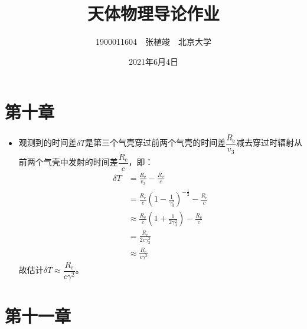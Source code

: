 \documentclass[a4paper,fontset=none]{ctexart}
\begin{document}
\title{\textbf{天体物理导论作业}}
\author{1900011604\ \ 张植竣\ \ 北京大学}
\date{2021年6月4日}
\maketitle

\section*{第十章}

\begin{itemize}

\item[1.]
观测到的时间差$\delta T$是第三个气壳穿过前两个气壳的时间差$\dfrac{R_\mathrm{e}}{v_3}$减去穿过时辐射从前两个气壳中发射的时间差$\dfrac{R_\mathrm{e}}{c}$，即：
\begin{align*}
    \delta T
    &= \frac{R_\mathrm{e}}{v_3} - \frac{R_\mathrm{e}}{c} \\
    &= \frac{R_\mathrm{e}}{c}\left(1 - \frac{1}{\gamma_3^2}\right)^{-\tfrac{1}{2}} - \frac{R_\mathrm{e}}{c} \\
    &\approx \frac{R_\mathrm{e}}{c}\left(1 + \frac{1}{2\gamma_3^2}\right) - \frac{R_\mathrm{e}}{c} \\
    &= \frac{R_\mathrm{e}}{2c\gamma_3^2} \\
    &\approx \frac{R_\mathrm{e}}{c\gamma^2}
\end{align*}
故估计$\delta T\approx\dfrac{R_\mathrm{e}}{c\gamma^2}$。

\end{itemize}

\section*{第十一章}
\end{document}

